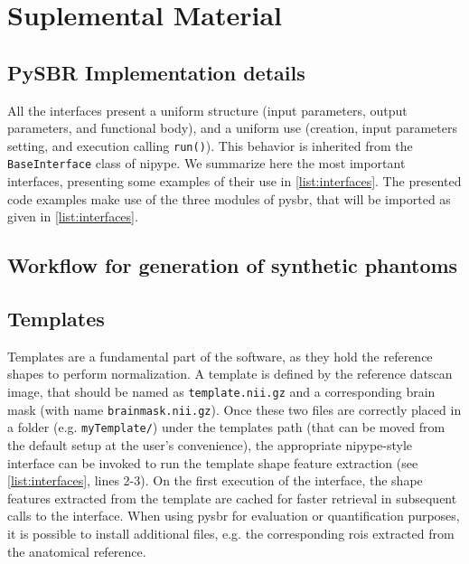 \documentclass{frontiers}
\newcommand{\fixme}[1]{}
\newcommand{\fixme}[1]{{\color{red}{\bf FIXME: }\emph{#1}}}
\begin{document}
\newpage
\appendix
\setcounter{page}{1}
\renewcommand*{\thepage}{Suplemental Material - \arabic{page}}
\section*{Suplemental Material}\label{supl}

\subsection*{PySBR Implementation details}
\label{supl:implementation_details}

All the interfaces present a uniform structure (input parameters, output parameters,
  and functional body), and a uniform use (creation, input parameters setting, and
  execution calling \texttt{run()}).
This behavior is inherited from the \texttt{BaseInterface} class of \gls*{nipype}.
We summarize here the most important interfaces,
  presenting some examples of their use in \autoref{list:interfaces}.
The presented code examples make use of the three modules of 
  \gls*{pysbr}, that will be imported as given in \autoref{list:interfaces}.

\subsection*{Workflow for generation of synthetic phantoms}
\label{supl:synth_phantom_wf}
\fixme{here the workflow with some exemplary images}

\subsection*{Templates}
\label{supl:templates}
Templates are a fundamental part of the software, as they hold the reference shapes to
  perform normalization.
A template is defined by the reference \gls*{datscan} image, that
  should be named as \texttt{template.nii.gz} and a corresponding brain mask (with name
  \texttt{brainmask.nii.gz}).
Once these two files are correctly placed in a folder
  (e.g. \texttt{myTemplate/}) under the templates path (that can be moved from the
  default setup at the user's convenience), the appropriate \gls*{nipype}-style
  interface can be invoked to run the template shape feature extraction (see
  \autoref{list:interfaces}, lines 2-3).
On the first execution of the interface, the shape features extracted from
  the template are cached for faster retrieval in subsequent calls to the interface. 
When using \gls*{pysbr} for evaluation or quantification purposes, it is possible
  to install additional files, e.g. the corresponding \glspl*{roi} extracted
  from the anatomical reference.
\end{document}
